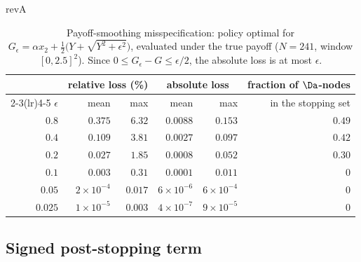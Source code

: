 \begin{table}[htbp]
\begin{rv}{revA}{}
\centering\small
\caption{Payoff-smoothing misspecification: policy optimal for
$G_\epsilon=\alpha x_2+\tfrac12\big(Y+\sqrt{Y^2+\epsilon^2}\big)$, evaluated under the true payoff
($N=241$, window $[0,2.5]^2$). Since $0\le G_\epsilon-G\le\epsilon/2$, the absolute loss is at most
$\epsilon$.}\label{tab:smoothing}
\begin{tabular}{@{}rrrrrr@{}}
\toprule
 & \multicolumn{2}{c}{relative loss (\%)} & \multicolumn{2}{c}{absolute loss} & fraction of $\Da$-nodes\\
\cmidrule(lr){2-3}\cmidrule(lr){4-5}
$\epsilon$ & mean & max & mean & max & in the stopping set\\
\midrule
$0.8$ & $0.375$ & $6.32$ & $0.0088$ & $0.153$ & $0.49$\\
$0.4$ & $0.109$ & $3.81$ & $0.0027$ & $0.097$ & $0.42$\\
$0.2$ & $0.027$ & $1.85$ & $0.0008$ & $0.052$ & $0.30$\\
$0.1$ & $0.003$ & $0.31$ & $0.0001$ & $0.011$ & $0$\\
$0.05$ & $2\times10^{-4}$ & $0.017$ & $6\times10^{-6}$ & $6\times10^{-4}$ & $0$\\
$0.025$ & $1\times10^{-5}$ & $0.003$ & $4\times10^{-7}$ & $9\times10^{-5}$ & $0$\\
\bottomrule
\end{tabular}
\end{rv}
\end{table}

\subsection{Signed post-stopping term}\label{sec:biasnum}


